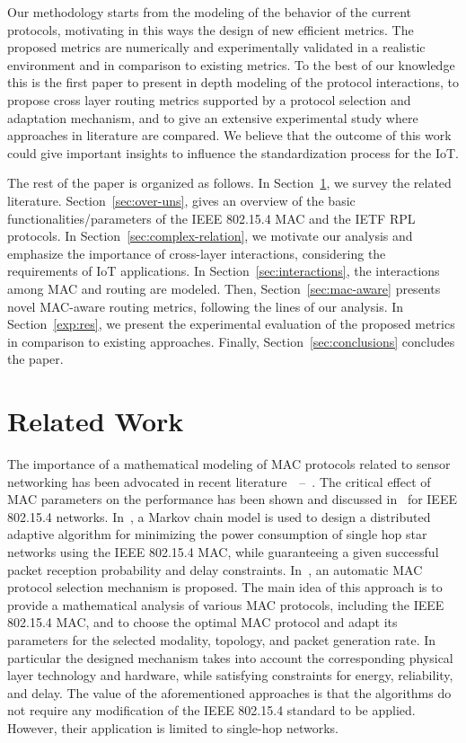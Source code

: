 \documentclass[review, 1p, 11pt]{elsarticle}
\numberwithin{equation}{section}
\begin{document}
Our methodology starts from the modeling of the behavior of the current protocols, motivating in this ways the design of new efficient metrics. The proposed metrics are numerically and experimentally validated in a realistic environment and in comparison to existing metrics. To the best of our knowledge this is the first paper to present in depth modeling of the protocol interactions, to propose cross layer routing metrics supported by a protocol selection and adaptation mechanism, and to give an extensive experimental study where approaches in literature are compared. We believe that the outcome of this work could give important insights to influence the standardization process for the IoT.


The rest of the paper is organized as follows. In Section~\ref{sec:rel}, we survey the related literature. Section~\ref{sec:over-uns}, gives an overview of the basic functionalities/parameters of the IEEE 802.15.4 MAC and the IETF RPL protocols. In Section~\ref{sec:complex-relation}, we motivate our analysis and emphasize the importance of cross-layer interactions, considering the requirements of IoT applications. In
Section~\ref{sec:interactions}, the interactions among MAC and
routing are modeled. Then, Section~\ref{sec:mac-aware} presents novel MAC-aware routing metrics, following the lines of our analysis.  In Section~\ref{exp:res}, we present the experimental evaluation of the proposed metrics in comparison to existing approaches. Finally, Section~\ref{sec:conclusions}
concludes the paper.

\section{Related Work}\label{sec:rel}

The importance of a mathematical modeling of MAC protocols related to sensor networking has been advocated in recent literature~\cite{misicCC}\nocite{Park_TON}~--~\cite{Sinem09_glo}. The critical effect of MAC parameters on the performance has been shown and discussed in~\cite{misicCC}  for IEEE 802.15.4 networks.
In~\cite{Park_TON}, a Markov chain model is used to design a distributed adaptive algorithm for minimizing the power consumption of single hop star networks using the IEEE 802.15.4 MAC, while guaranteeing a given successful packet reception
probability and delay constraints.
In~\cite{Sinem09_glo}, an automatic MAC protocol selection mechanism is proposed.
The main idea of this approach is to provide a mathematical analysis of various MAC protocols, including the IEEE 802.15.4 MAC,
and to choose the optimal MAC protocol and adapt its parameters for the selected modality, topology, and packet
generation rate. In particular the designed mechanism takes into account the corresponding physical
layer technology and hardware, while satisfying constraints for energy, reliability, and delay.
The value of the aforementioned approaches is that the algorithms do not require any modification of the IEEE 802.15.4
standard to be applied.
However, their application is limited to single-hop networks.
\end{document}
